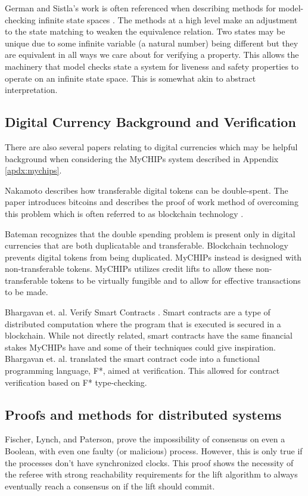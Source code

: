 \documentclass[runningheads]{llncs}
\begin{document}
German and Sistla's work is often referenced when describing methods for model-checking infinite state spaces \cite{component_language}\cite{lowe_parameterized}\cite{view_abstraction}. The methods at a high level make an adjustment to the state matching to weaken the equivalence relation. Two states may be unique due to some infinite variable (a natural number) being different but they are equivalent in all ways we care about for verifying a property. This allows the machinery that model checks state a system for liveness and safety properties to operate on an infinite state space. This is somewhat akin to abstract interpretation. 

\subsection{Digital Currency Background and Verification}
There are also several papers relating to digital currencies which may be helpful background when considering the MyCHIPs system described in Appendix \ref{apdx:mychips}.

 Nakamoto describes how transferable digital tokens can be double-spent. The paper introduces bitcoins and describes the proof of work method of overcoming this problem which is often referred to as blockchain technology \cite{bitcoin}.

 Bateman recognizes that the double spending problem is present only in digital currencies that are both duplicatable and transferable. Blockchain technology prevents digital tokens from being duplicated. MyCHIPs instead is designed with non-transferable tokens. MyCHIPs utilizes credit lifts to allow these non-transferable tokens to be virtually fungible and to allow for effective transactions to be made. 
 
 Bhargavan et. al. Verify Smart Contracts \cite{SmartContracts}. Smart contracts are a type of distributed computation where the program that is executed is secured in a blockchain. While not directly related, smart contracts have the same financial stakes MyCHIPs have and some of their techniques could give inspiration.  Bhargavan et. al. translated the smart contract code into a functional programming language, F*, aimed at verification. This allowed for contract verification based on F* type-checking.

 \subsection{Proofs and methods for distributed systems}
 Fischer, Lynch, and Paterson\cite{Fischer}, prove the impossibility of consensus on even a Boolean, with even one faulty (or malicious) process. However, this is only true if the processes don't have synchronized clocks. This proof shows the necessity of the referee with strong reachability requirements for the lift algorithm to always eventually reach a consensus on if the lift should commit.
 
\end{document}
